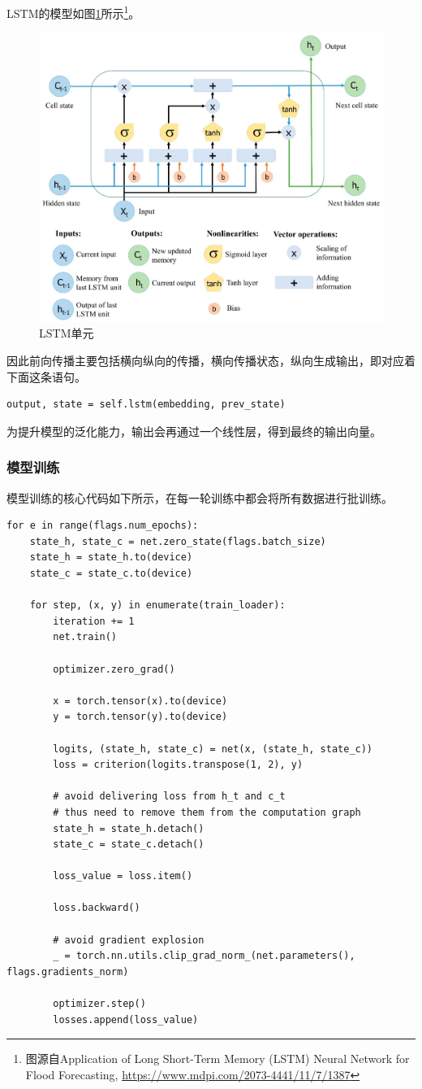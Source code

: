 \documentclass[logo,reportComp]{thesis}
\begin{document}
LSTM的模型如图\ref{fig:lstm-unit}所示\footnote{图源自Application of Long Short-Term Memory (LSTM) Neural Network for Flood Forecasting, \url{https://www.mdpi.com/2073-4441/11/7/1387}}。
\begin{figure}[H]
\centering
\includegraphics[width=0.8\linewidth]{fig/lstm-unit.png}
\caption{LSTM单元}
\label{fig:lstm-unit}
\end{figure}

因此前向传播主要包括横向纵向的传播，横向传播状态，纵向生成输出，即对应着下面这条语句。
\begin{lstlisting}
output, state = self.lstm(embedding, prev_state)
\end{lstlisting}

为提升模型的泛化能力，输出会再通过一个线性层，得到最终的输出向量。

\subsubsection{模型训练}
模型训练的核心代码如下所示，在每一轮训练中都会将所有数据进行批训练。
\begin{lstlisting}
for e in range(flags.num_epochs):
    state_h, state_c = net.zero_state(flags.batch_size)
    state_h = state_h.to(device)
    state_c = state_c.to(device)

    for step, (x, y) in enumerate(train_loader):
        iteration += 1
        net.train()

        optimizer.zero_grad()

        x = torch.tensor(x).to(device)
        y = torch.tensor(y).to(device)

        logits, (state_h, state_c) = net(x, (state_h, state_c))
        loss = criterion(logits.transpose(1, 2), y)

        # avoid delivering loss from h_t and c_t
        # thus need to remove them from the computation graph
        state_h = state_h.detach()
        state_c = state_c.detach()

        loss_value = loss.item()

        loss.backward()

        # avoid gradient explosion
        _ = torch.nn.utils.clip_grad_norm_(net.parameters(), flags.gradients_norm)

        optimizer.step()
        losses.append(loss_value)
\end{lstlisting}
\end{document}
